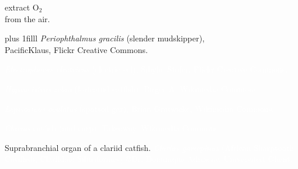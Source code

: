 \documentclass[t,handout]{beamer}  %
\begin{document}
{
\begin{frame}[b,plain]

\vspace{5\baselineskip}

\hangpara\Large\hspace{64mm} extract O$_2$\\
\hspace{64mm}from the air.

\vskip0pt plus 1filll
\hfill\tiny\textit{Periophthalmus gracilis} (slender mudskipper),\\
\hfill PacificKlaus, Flickr Creative Commons.
\end{frame}
}

{
\begin{frame}[b,plain]
\hfill\tiny\textcolor{white}{\textit{Electrophorus electricus} (electric eel), Sibylie Stofer, Flickr Creative Commons.}
\end{frame}
}

{
\begin{frame}[b,plain]
\tiny\textcolor{white}{\textit{Hypancistrus zebra} (loricariid catfish), Birger A, Wikimedia Commons.}
\end{frame}
}

{
\begin{frame}[b,plain]
\tiny\textcolor{white}{\textit{Lepisosteus oculatus} (spotted gar), Brian Gratwicke, Wikimedia Commons.}
\end{frame}
}


{
\begin{frame}[b,plain]
\hfill\tiny\textcolor{white}{\textit{Clarias} catfish (and carp), Takeaway, Wikimedia Commons.}
\end{frame}
}

{
\begin{frame}[b,plain]{Suprabranchial organ of a clariid catfish.}
\tiny\textcolor{white}{\textit{Clarias gariepinus} (African Sharptooth Catifhsh, Clariidae: Siluriformes) \copyright Dr. Dominique Adriaens, Universiteit Ghent.}
\end{frame}
}
\end{document}

